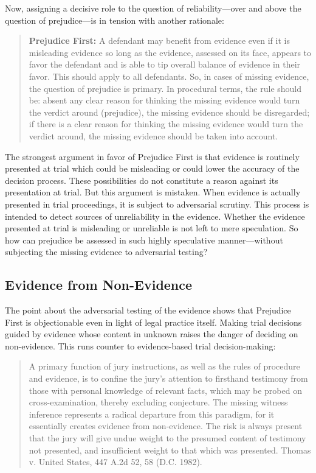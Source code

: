 \documentclass[
  10pt,
  dvipsnames,enabledeprecatedfontcommands]{scrartcl}
\begin{document}
\noindent Now, assigning a decisive role to the question of
reliability---over and above the question of prejudice---is in tension
with another rationale:

\begin{quote}
 \textbf{Prejudice First:} A defendant may benefit from evidence even if it is misleading evidence so long as the evidence, assessed on its face, appears to favor the defendant and is able to tip overall balance of evidence in their favor. This should apply to all defendants. So, in cases of missing evidence, the question of prejudice is primary. In procedural terms, the rule should be: absent any clear reason for thinking the missing evidence would turn the verdict around (prejudice), the missing evidence should be disregarded; if there is a clear reason for thinking the missing evidence would turn the verdict around, the missing evidence should be taken into account.
\end{quote}

\noindent The strongest argument in favor of Prejudice First is that
evidence is routinely presented at trial which could be misleading or
could lower the accuracy of the decision process. These possibilities do
not constitute a reason against its presentation at trial. But this
argument is mistaken. When evidence is actually presented in trial
proceedings, it is subject to adversarial scrutiny. This process is
intended to detect sources of unreliability in the evidence. Whether the
evidence presented at trial is misleading or unreliable is not left to
mere speculation. So how can prejudice be assessed in such highly
speculative manner---without subjecting the missing evidence to
adversarial testing?

\hypertarget{evidence-from-non-evidence}{%
\subsection{Evidence from
Non-Evidence}\label{evidence-from-non-evidence}}

The point about the adversarial testing of the evidence shows that
Prejudice First is objectionable even in light of legal practice itself.
Making trial decisions guided by evidence whose content in unknown
raises the danger of deciding on non-evidence. This runs counter to
evidence-based trial decision-making:

\begin{quote}
A primary function of jury instructions, as well as the rules of
procedure and evidence, is to confine the jury's attention to firsthand
testimony from those with personal knowledge of relevant facts, which
may be probed on cross-examination, thereby excluding conjecture. The
missing witness inference represents a radical departure from this
paradigm, for it essentially creates evidence from non-evidence. The
risk is always present that the jury will give undue weight to the
presumed content of testimony not presented, and insufficient weight to
that which was presented. Thomas v. United States, 447 A.2d 52, 58 (D.C.
1982).
\end{quote}
\end{document}
